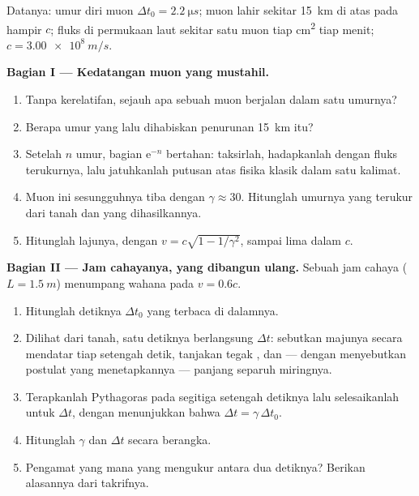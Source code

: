 \begin{problem}
\label{pb:g12:special-relativity:1}
Datanya: umur diri muon $\Delta t_0 = \qty{2.2}{\micro s}$; muon lahir
sekitar \qty{15}{km} di atas pada hampir $c$; fluks di permukaan laut sekitar satu muon tiap
\unit{cm^2} tiap menit; $c = \qty{3.00e8}{m/s}$.

\medskip
\noindent\textbf{Bagian I --- Kedatangan muon yang mustahil.}
\begin{enumerate}
  \item Tanpa kerelatifan, sejauh apa sebuah muon berjalan dalam satu umurnya?
  \item Berapa umur yang lalu dihabiskan penurunan \qty{15}{km} itu?
  \item Setelah $n$ umur, bagian $\mathrm{e}^{-n}$ bertahan:
        taksirlah, hadapkanlah dengan fluks terukurnya, lalu jatuhkanlah putusan atas
        fisika klasik dalam satu kalimat.
  \item Muon ini sesungguhnya tiba dengan $\gamma \approx 30$. Hitunglah
        umurnya yang terukur dari tanah dan  yang dihasilkannya.
  \item Hitunglah lajunya, dengan $v = c\sqrt{1 - 1/\gamma^2}$, sampai lima
         dalam  $c$.
\end{enumerate}

\medskip
\noindent\textbf{Bagian II --- Jam cahayanya, yang dibangun ulang.}
Sebuah jam cahaya ($L = \qty{1.5}{m}$) menumpang wahana pada $v = 0.6c$.
\begin{enumerate}[resume]
  \item Hitunglah detiknya $\Delta t_0$ yang terbaca di dalamnya.
  \item Dilihat dari tanah, satu detiknya berlangsung $\Delta t$: sebutkan majunya
        secara mendatar tiap setengah detik, tanjakan tegak , dan --- dengan menyebutkan
        postulat yang menetapkannya --- panjang separuh  miringnya.
  \item Terapkanlah Pythagoras pada segitiga setengah detiknya lalu selesaikanlah untuk
        $\Delta t$, dengan menunjukkan bahwa $\Delta t = \gamma\,\Delta t_0$.
  \item Hitunglah $\gamma$ dan $\Delta t$ secara berangka.
  \item Pengamat yang mana yang mengukur  antara dua detiknya? Berikan alasannya
        dari takrifnya.
\end{enumerate}


\end{problem}
